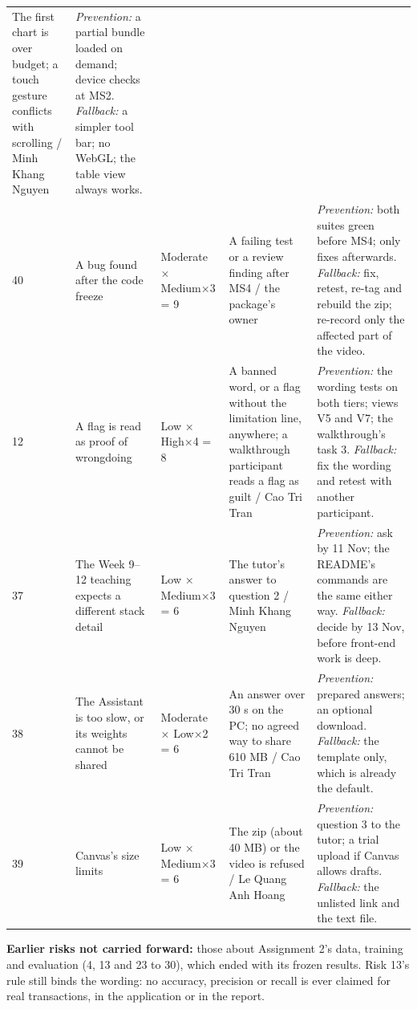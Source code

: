 {\begin{longtable}{@{}L{0.7cm}L{3.2cm}L{2.0cm}L{3.4cm}L{4.6cm}@{}}
The first chart is over budget; a touch gesture conflicts with scrolling / Minh Khang Nguyen &
\textit{Prevention:} a partial bundle loaded on demand; device checks at MS2.
\textit{Fallback:} a simpler tool bar; no WebGL; the table view always works. \\
40 & A bug found after the code freeze & Moderate × Medium×3 = 9 &
A failing test or a review finding after MS4 / the package's owner &
\textit{Prevention:} both suites green before MS4; only fixes afterwards. \textit{Fallback:} fix,
retest, re-tag and rebuild the zip; re-record only the affected part of the video. \\
12 & A flag is read as proof of wrongdoing & Low × High×4 = 8 &
A banned word, or a flag without the limitation line, anywhere; a walkthrough participant reads a
flag as guilt / Cao Tri Tran &
\textit{Prevention:} the wording tests on both tiers; views V5 and V7; the walkthrough's task 3.
\textit{Fallback:} fix the wording and retest with another participant. \\
37 & The Week 9--12 teaching expects a different stack detail & Low × Medium×3 = 6 &
The tutor's answer to question 2 / Minh Khang Nguyen &
\textit{Prevention:} ask by 11 Nov; the README's commands are the same either way.
\textit{Fallback:} decide by 13 Nov, before front-end work is deep. \\
38 & The Assistant is too slow, or its weights cannot be shared & Moderate × Low×2 = 6 &
An answer over 30 s on the PC; no agreed way to share 610 MB / Cao Tri Tran &
\textit{Prevention:} prepared answers; an optional download. \textit{Fallback:} the template only,
which is already the default. \\
39 & Canvas's size limits & Low × Medium×3 = 6 &
The zip (about 40 MB) or the video is refused / Le Quang Anh Hoang &
\textit{Prevention:} question 3 to the tutor; a trial upload if Canvas allows drafts.
\textit{Fallback:} the unlisted link and the text file. \\
\bottomrule
\end{longtable}
}

\textbf{Earlier risks not carried forward:} those about Assignment 2's data, training and evaluation
(4, 13 and 23 to 30), which ended with its frozen results. Risk 13's rule still binds the wording:
no accuracy, precision or recall is ever claimed for real transactions, in the application or in the
report.

